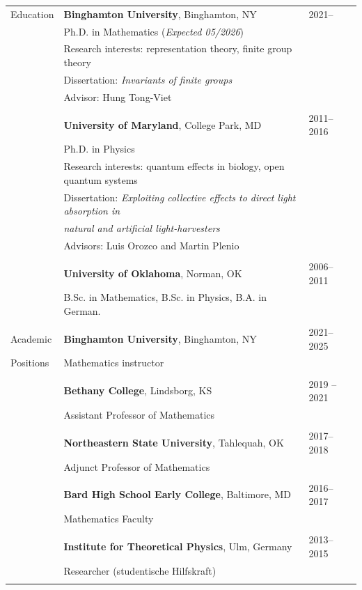 \documentclass[letterpaper,12pt,oneside]{article}
\begin{document}
\noindent \begin{longtable}{p{0.15\linewidth}p{0.7\linewidth}p{0.15\linewidth}}
 \large{Education}    & \textbf{Binghamton University}, Binghamton, NY & 2021-- \\
     & Ph.D. in Mathematics (\emph{Expected 05/2026}) %
     & \\
     & Research interests: representation theory, finite group theory & \\
     & Dissertation: \emph{Invariants of finite groups} &\\
     & Advisor: Hung Tong-Viet & \\
     & \\
    & \textbf{University of Maryland}, College Park, MD & 2011--2016 \\
     & Ph.D. in Physics & \\ %
     & Research interests: quantum effects in biology, open quantum systems & \\
     & Dissertation: \emph{Exploiting collective effects to direct light absorption in} \\& \quad \emph{natural and artificial light-harvesters} & \\
     & Advisors: Luis Orozco and Martin Plenio & \\
     & \\
     & \textbf{University of Oklahoma}, Norman, OK & 2006--2011 \\
     & B.Sc. in Mathematics, B.Sc. in Physics, B.A. in German. & \\ %
    & &\\
  \large{Academic}   & \textbf{Binghamton University}, Binghamton, NY  & 2021--2025  \\
  \large{Positions}  & Mathematics instructor  & \\
     & & \\

     & \textbf{Bethany College}, Lindsborg, KS & 2019 -- 2021  \\
     & Assistant Professor of Mathematics & \\
     & & \\
     
     &\textbf{Northeastern State University}, Tahlequah, OK & 2017--2018\\
     & Adjunct Professor of Mathematics & \\
     & & \\
     & \textbf{Bard High School Early College}, Baltimore, MD & 2016--2017 \\
     & Mathematics Faculty & \\
     & &\\
     & \textbf{Institute for Theoretical Physics}, Ulm, Germany & 2013--2015 \\
     & Researcher (studentische Hilfskraft) & \\
    &&\\


\end{longtable}
\end{document}

